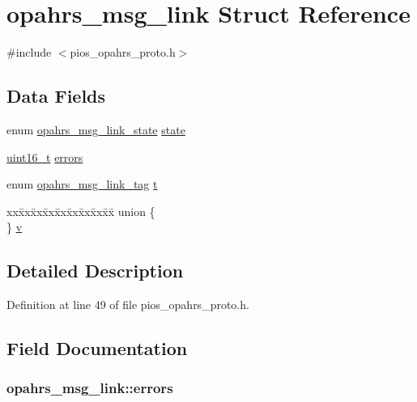 \hypertarget{structopahrs__msg__link}{\section{opahrs\-\_\-msg\-\_\-link Struct Reference}
\label{structopahrs__msg__link}
}


{\ttfamily \#include $<$pios\-\_\-opahrs\-\_\-proto.\-h$>$}

\subsection*{Data Fields}
\begin{DoxyCompactItemize}
\item 
enum \hyperlink{group___p_i_o_s___o_p_a_h_r_s_ga27b2f51b9ebeafdcfa5648d6d6e34074}{opahrs\-\_\-msg\-\_\-link\-\_\-state} \hyperlink{structopahrs__msg__link_ac08f69cb07956b7956b7cf7dae229279}{state}
\item 
\hyperlink{stdint_8h_a273cf69d639a59973b6019625df33e30}{uint16\-\_\-t} \hyperlink{structopahrs__msg__link_a78724ba1d6e2dbd9d5b6e00d45d34aea}{errors}
\item 
enum \hyperlink{group___p_i_o_s___o_p_a_h_r_s_ga8973c96ae9d6e7d40e63cb2bf0a78a79}{opahrs\-\_\-msg\-\_\-link\-\_\-tag} \hyperlink{structopahrs__msg__link_a3f0649f9d2f748da14bd963b6edb6385}{t}
\item 
\begin{tabbing}
xx\=xx\=xx\=xx\=xx\=xx\=xx\=xx\=xx\=\kill
union \{\\
\} \hyperlink{structopahrs__msg__link_a3aae1545139b261339d740201c2a49e0}{v}\\

\end{tabbing}\end{DoxyCompactItemize}


\subsection{Detailed Description}


Definition at line 49 of file pios\-\_\-opahrs\-\_\-proto.\-h.



\subsection{Field Documentation}
\hypertarget{structopahrs__msg__link_a78724ba1d6e2dbd9d5b6e00d45d34aea}{
\subsubsection[{errors}]{ opahrs\-\_\-msg\-\_\-link\-::errors}}\label{structopahrs__msg__link_a78724ba1d6e2dbd9d5b6e00d45d34aea}


